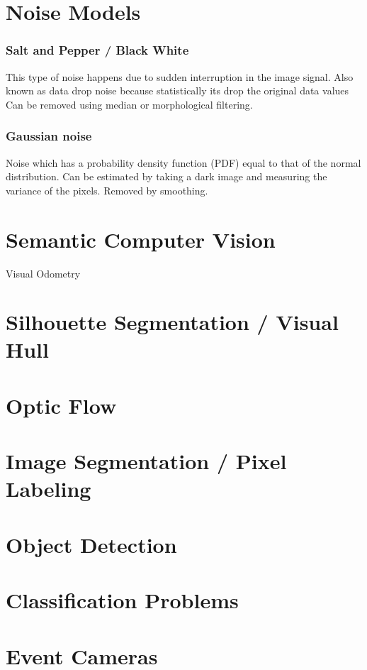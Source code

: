 \section{Noise Models}

\subsubsection{Salt and Pepper / Black White}
This type of noise happens due to sudden interruption in the image signal.
Also known as data drop noise because statistically its drop the original data values
Can be removed using median or morphological filtering.

\subsubsection{Gaussian noise}
Noise which has a probability density function (PDF) equal to that of the normal distribution.
Can be estimated by taking a dark image and measuring the variance of the pixels. Removed by smoothing.

\section{Semantic Computer Vision} 

Visual Odometry

\section{Silhouette Segmentation / Visual Hull}

\section{Optic Flow}

\section{Image Segmentation / Pixel Labeling}

\section{Object Detection}

\section{Classification Problems}

\section{Event Cameras}

